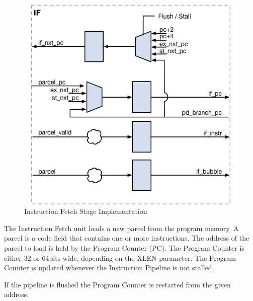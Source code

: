 \begin{figure}[h]
  \includegraphics{assets/img/Pipeline-IF}
  \caption{Instruction Fetch Stage Implementation}
\end{figure}

The Instruction Fetch unit loads a new parcel from the program memory.
A parcel is a code field that contains one or more instructions.
The address of the parcel to load is held by the Program Counter (PC).
The Program Counter is either 32 or 64bits wide, depending on the XLEN parameter.
The Program Counter is updated whenever the Instruction Pipeline is not stalled.

If the pipeline is flushed the Program Counter is restarted from the given address.


